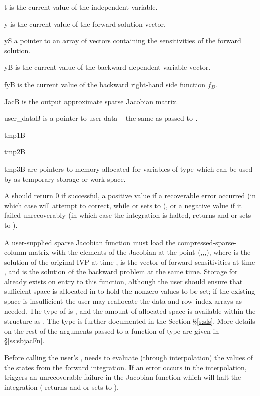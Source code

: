 {
  \begin{args}
  \item[t]
    is the current value of the independent variable.
  \item[y]
    is the current value of the forward solution vector.
  \item[yS]
    a pointer to an array of  vectors containing the sensitivities
    of the forward solution.
  \item[yB]
    is the current value of the backward dependent variable vector.
  \item[fyB]
    is the current value of the backward right-hand side function $f_B$.
  \item[JacB]
    is the output approximate sparse Jacobian matrix. 
  \item[user\_dataB]
    is a pointer to user data -- the same as passed to . 
  \item[tmp1B]
  \item[tmp2B]
  \item[tmp3B]
    are pointers to memory allocated  for variables of type  which 
    can be used by  as temporary storage or work space.    
  \end{args}
}
{
  A  should return 0 if successful, a positive
  value if a recoverable error occurred (in which case {\cvodes} will
  attempt to correct, while {\cvklu} or {\cvsuperlumt} sets
   to ), or a negative value
  if it failed unrecoverably (in which case the integration is halted,
   returns  and {\cvklu} or
  {\cvsuperlumt} sets  to ).
}
{
  A user-supplied sparse Jacobian function must load the
  compressed-sparse-column matrix  with the elements of the
  Jacobian at the point (,,,), where 
  is the solution of the original IVP at time ,  is the
  vector of forward sensitivities at time , and  is the
  solution of the backward problem at the same time.  Storage for
   already exists on entry to this function, although the
  user should ensure that sufficient space is allocated in 
  to hold the nonzero values to be set; if the existing space is
  insufficient the user may reallocate the data and row index arrays
  as needed.  The type of  is , and the amount of
  allocated space is available within the  structure as
  .  The  type is further documented in the Section
  \S\ref{s:sls}.  More details on the rest of the arguments passed to
  a function of type  are given in
  \S\ref{ss:sbjacFn}.

  {\warn}Before calling the user's , {\cvodes}
  needs to evaluate (through interpolation) the values of the states
  from the forward integration.  If an error occurs in the
  interpolation, {\cvodes} triggers an unrecoverable failure in the
  Jacobian function which will halt the integration (
  returns  and {\cvklu} or {\cvsuperlumt} sets
   to ).
}

